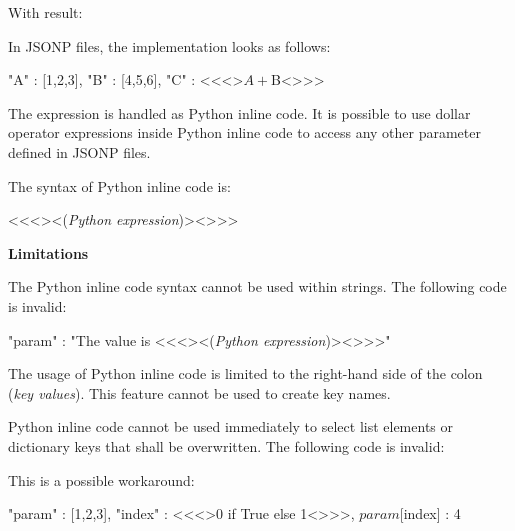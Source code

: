 With result:

\begin{pythonlog}
[1, 2, 3, 4, 5, 6]
\end{pythonlog}

In JSONP files, the implementation looks as follows:

\begin{pythoncode}
"A" : [1,2,3],
"B" : [4,5,6],
"C" : <\textless{}\textless{}>${A} + ${B}<\textgreater{}\textgreater{}>
\end{pythoncode}

The expression  is handled as Python inline code. It is possible to use dollar operator expressions
inside Python inline code to access any other parameter defined in JSONP files.

\vspace{2ex}

The syntax of Python inline code is:

\begin{pythoncode}
<\textless{}\textless{}><(\emph{Python expression})><\textgreater{}\textgreater{}>
\end{pythoncode}

\vspace{2ex}

\textbf{Limitations}

The Python inline code syntax cannot be used within strings. The following code is invalid:

\begin{pythoncode}
"param" : "The value is <\textless{}\textless{}><(\emph{Python expression})><\textgreater{}\textgreater{}>"
\end{pythoncode}

The usage of Python inline code is limited to the right-hand side of the colon (\emph{key values}).
This feature cannot be used to create key names.

Python inline code cannot be used immediately to select list elements or dictionary keys that shall be overwritten. The following code is invalid:


This is a possible workaround:

\begin{pythoncode}
"param" : [1,2,3],
"index" : <\textless{}\textless{}>0 if True else 1<\textgreater{}\textgreater{}>,
${param}[${index}] : 4
\end{pythoncode}

